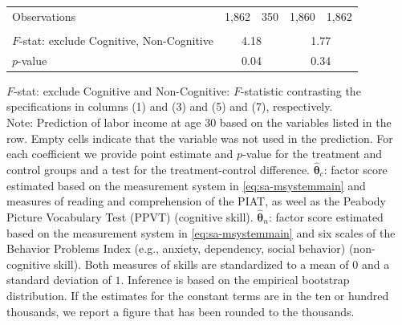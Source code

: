\documentclass[static]{JJH-Beamer}
\begin{document}
\begin{frame}
\begin{table}[H]
\begin{center}
{\begin{tabular}{lcccccccc}
Observations &       \multicolumn{2}{c}{1,862} &            \multicolumn{2}{c}{350} &           \multicolumn{2}{c}{1,860} &          \multicolumn{2}{c}{1,862}   \\  \\
\midrule
$F$-stat: exclude Cognitive, Non-Cognitive &                      \multicolumn{4}{c}{4.18} &                      \multicolumn{4}{c}{1.77}   \\
$p$-value &             \multicolumn{4}{c}{0.04} &                  \multicolumn{4}{c}{0.34}  \\
\bottomrule
\end{tabular}
}
\end{center}
\tiny \flushleft
$F$-stat: exclude Cognitive and Non-Cognitive: $F$-statistic contrasting the specifications in columns (1) and (3) and (5) and (7), respectively.\\
Note: Prediction of labor income at age 30 based on the variables listed in the row. Empty cells indicate that the variable was not used in the prediction. For each coefficient we provide point estimate and $p$-value for the treatment and control groups and a test for the treatment-control difference. $\hat{\bm{\theta}}_{c}$: factor score estimated based on the measurement system in \eqref{eq:sa-msystemmain} and measures of reading and comprehension of the PIAT, as weel as the Peabody Picture Vocabulary Test (PPVT) (cognitive skill). $\hat{\bm{\theta}}_{n}$: factor score estimated based on the measurement system in \eqref{eq:sa-msystemmain} and six scales of the Behavior Problems Index (e.g., anxiety, dependency, social behavior) (non-cognitive skill). Both measures of skills are standardized to a mean of $0$ and a standard deviation of $1$. Inference is based on the empirical bootstrap distribution. If the estimates for the constant terms are in the ten or hundred thousands, we report a figure that has been rounded to the thousands.\\
\end{table}

\end{frame}
\end{document}
